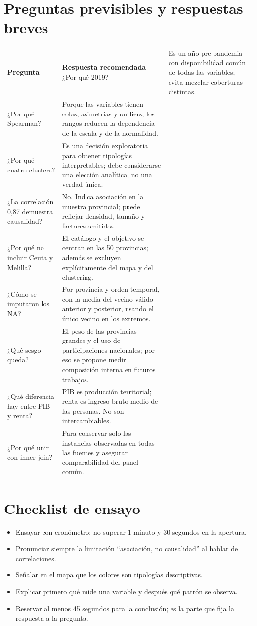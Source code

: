 \documentclass[11pt,a4paper]{article}
\begin{document}
\section{Preguntas previsibles y respuestas breves}
\begin{longtable}{p{}p{}}
\toprule\textbf{Pregunta} & \textbf{Respuesta recomendada}\
\midrule\endhead
¿Por qué 2019? & Es un año pre-pandemia con disponibilidad común de todas las variables; evita mezclar coberturas distintas.\\
¿Por qué Spearman? & Porque las variables tienen colas, asimetrías y outliers; los rangos reducen la dependencia de la escala y de la normalidad.\\
¿Por qué cuatro clusters? & Es una decisión exploratoria para obtener tipologías interpretables; debe considerarse una elección analítica, no una verdad única.\\
¿La correlación 0,87 demuestra causalidad? & No. Indica asociación en la muestra provincial; puede reflejar densidad, tamaño y factores omitidos.\\
¿Por qué no incluir Ceuta y Melilla? & El catálogo y el objetivo se centran en las 50 provincias; además se excluyen explícitamente del mapa y del clustering.\\
¿Cómo se imputaron los NA? & Por provincia y orden temporal, con la media del vecino válido anterior y posterior, usando el único vecino en los extremos.\\
¿Qué sesgo queda? & El peso de las provincias grandes y el uso de participaciones nacionales; por eso se propone medir composición interna en futuros trabajos.\\
¿Qué diferencia hay entre PIB y renta? & PIB es producción territorial; renta es ingreso bruto medio de las personas. No son intercambiables.\\
¿Por qué unir con inner join? & Para conservar solo las instancias observadas en todas las fuentes y asegurar comparabilidad del panel común.\\
\bottomrule\end{longtable}

\section{Checklist de ensayo}
\begin{itemize}[leftmargin=1.5em]
\item Ensayar con cronómetro: no superar 1 minuto y 30 segundos en la apertura.
\item Pronunciar siempre la limitación ``asociación, no causalidad'' al hablar de correlaciones.
\item Señalar en el mapa que los colores son tipologías descriptivas.
\item Explicar primero qué mide una variable y después qué patrón se observa.
\item Reservar al menos 45 segundos para la conclusión; es la parte que fija la respuesta a la pregunta.
\end{itemize}
\end{document}
